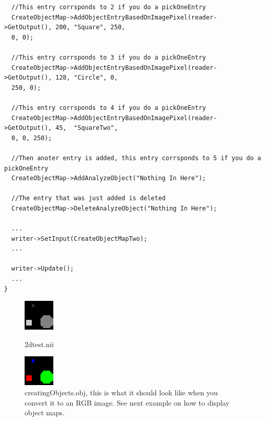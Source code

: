 \documentclass{InsightArticle}
\begin{document}
\begin{itemize}
\begin{verbatim}
  //This entry corrsponds to 2 if you do a pickOneEntry
  CreateObjectMap->AddObjectEntryBasedOnImagePixel(reader->GetOutput(), 200, "Square", 250,
  0, 0);

  //This entry corrsponds to 3 if you do a pickOneEntry
  CreateObjectMap->AddObjectEntryBasedOnImagePixel(reader->GetOutput(), 128, "Circle", 0,
  250, 0);

  //This entry corrsponds to 4 if you do a pickOneEntry
  CreateObjectMap->AddObjectEntryBasedOnImagePixel(reader->GetOutput(), 45,  "SquareTwo",
  0, 0, 250);

  //Then anoter entry is added, this entry corrsponds to 5 if you do a pickOneEntry
  CreateObjectMap->AddAnalyzeObject("Nothing In Here");

  //The entry that was just added is deleted
  CreateObjectMap->DeleteAnalyzeObject("Nothing In Here");
  
  ...
  writer->SetInput(CreateObjectMapTwo);
  ...
  
  writer->Update();
  ...
}
\end{verbatim} \normalsize

\begin{figure}[h]
  \hfill
  \begin{minipage}[t]{.45\textwidth}
    \begin{center}  
      \includegraphics[width=.28\textwidth]{2dtest.eps}
      \caption{2dtest.nii}
      \label{fig-tc}
    \end{center}
  \end{minipage}
  \hfill
  \begin{minipage}[t]{.45\textwidth}
    \begin{center}  
      \includegraphics[width=.28\textwidth]{creatingObject.eps}
      \caption{creatingObjects.obj, this is what it should look like when you convert it to an RGB image.  See next example on how to display 
    object maps.}
      \label{fig-tc}
    \end{center}
  \end{minipage}
  \hfill
\end{figure} 


\end{itemize}
\end{document}
